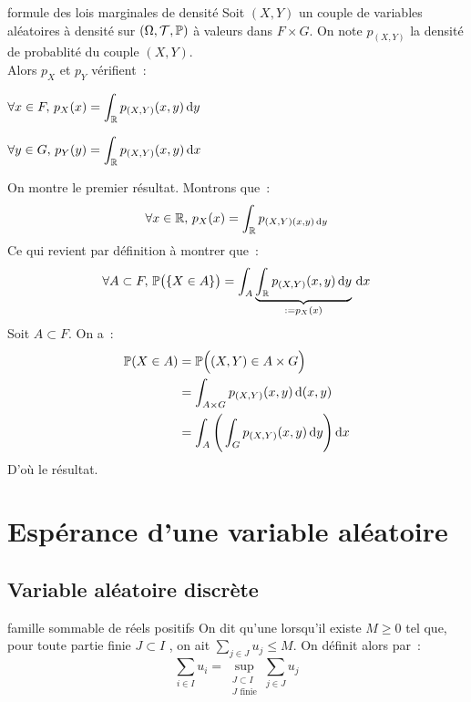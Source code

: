 \begin{proposition}{}{formule des lois marginales de densité}
    Soit $(X,Y)$ un couple de variables aléatoires à densité sur $(\Omega, \mathcal{T}, \mathbb{P})$ à valeurs dans $F\times G$. On note $p_{(X,Y)}$ la densité de probablité du couple $(X,Y)$. \\ Alors $p_X$ et $p_Y$ vérifient~:
    \begin{enumeratebf}
        \item $\displaystyle \forall x \in F,\,  p_X(x) = \int_{\mathbb{R}} p_{(X,Y)}(x,y)\,\mathrm{d}y$
        \item $\displaystyle \forall y \in G,\,  p_Y(y) = \int_{\mathbb{R}} p_{(X,Y)}(x,y)\,\mathrm{d}x$
    \end{enumeratebf}
\end{proposition}

\begin{demonstration}
    On montre le premier résultat. Montrons que~:
    $$\forall x \in \mathbb{R},\,  p_X(x) = \int_{\mathbb{R}} p_{(X,Y)(x,y)\,\mathrm{d}y}$$
    Ce qui revient par définition à montrer que~:
    $$\forall A \subset F,\, \mathbb{P}\big(\{X \in A\}\big) = \int_A \underbrace{\int_{\mathbb{R}} p_{(X,Y)}(x,y)\,\mathrm{d}y}_{:=p_X(x)} \,\mathrm{d}x$$
    Soit $A \subset F$. On a~:
    \begin{align*}
        \mathbb{P}(X \in A) &= \mathbb{P}\Big((X,Y) \in A \times G\Big)\\
        &= \int_{A \times G} p_{(X,Y)}(x,y)\,\mathrm{d}(x,y) \\
        &= \int_A \Bigg(\int_G p_{(X,Y)}(x,y)\,\mathrm{d}y\Bigg)\,\mathrm{d}x
    \end{align*}
    D'où le résultat.
\end{demonstration}


\section{Espérance d'une variable aléatoire}
\subsection{Variable aléatoire discrète}

\begin{definition}{}{famille sommable de réels positifs}
    On dit qu’une  lorsqu’il existe $M\geq 0$ tel que, pour toute partie finie $J \subset I$ , on ait $\sum_{j \in J}u_j \leq M$.
    On définit alors  par~:
    $$\sum_{i \in I}u_i = \sup_{\substack{J \subset I \\ J\text{ finie}}} \sum_{j \in J} u_j$$
\end{definition}

